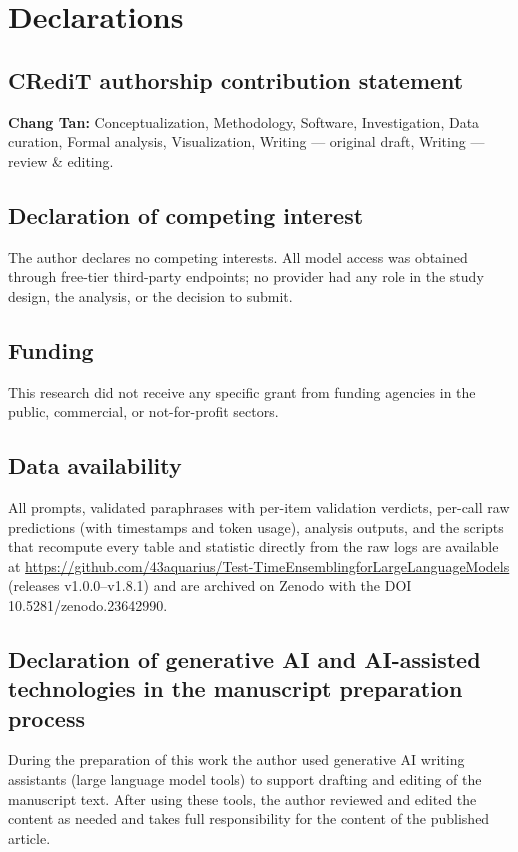 \documentclass[preprint,12pt]{elsarticle}
\newcommand{\zenododoi}{10.5281/zenodo.23642990}
\begin{document}








\section*{Declarations}

\subsection*{CRediT authorship contribution statement}
\textbf{Chang Tan:} Conceptualization, Methodology, Software, Investigation, Data curation, Formal analysis, Visualization, Writing --- original draft, Writing --- review \& editing.

\subsection*{Declaration of competing interest}
The author declares no competing interests. All model access was obtained through free-tier third-party endpoints; no provider had any role in the study design, the analysis, or the decision to submit.

\subsection*{Funding}
This research did not receive any specific grant from funding agencies in the public, commercial, or not-for-profit sectors.

\subsection*{Data availability}
All prompts, validated paraphrases with per-item validation verdicts, per-call raw predictions (with timestamps and token usage), analysis outputs, and the scripts that recompute every table and statistic directly from the raw logs are available at \url{https://github.com/43aquarius/Test-TimeEnsemblingforLargeLanguageModels} (releases v1.0.0--v1.8.1) and are archived on Zenodo with the DOI \zenododoi.

\subsection*{Declaration of generative AI and AI-assisted technologies in the manuscript preparation process}
During the preparation of this work the author used generative AI writing assistants (large language model tools) to support drafting and editing of the manuscript text. After using these tools, the author reviewed and edited the content as needed and takes full responsibility for the content of the published article.

\appendix
\renewcommand{\thetable}{\Alph{section}.\arabic{table}}




\end{document}
